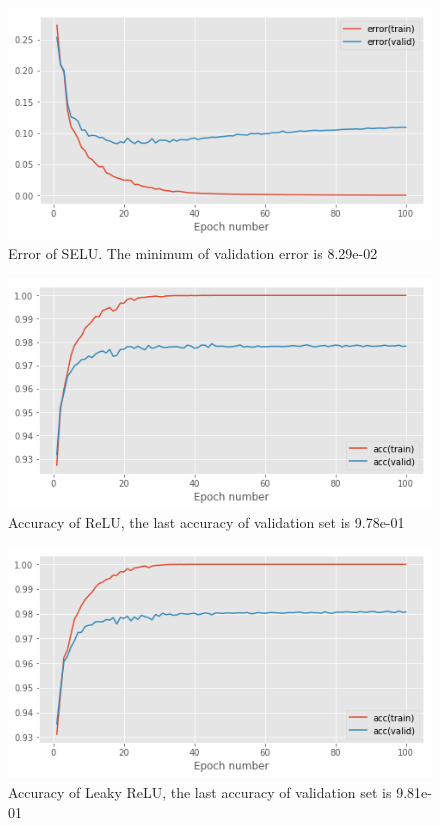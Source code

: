\documentclass{article}
\begin{document}
\begin{figure}[tb]
\vskip 5mm
\begin{center}
\centerline{\includegraphics[width=\columnwidth]{selu2e.png}}
\caption{Error of SELU. The minimum of validation error is 8.29e-02}
\label{fig:sample-graph}
\end{center}
\vskip -5mm
\end{figure}
\begin{figure}[tb]
\vskip 5mm
\begin{center}
\centerline{\includegraphics[width=\columnwidth]{relu2a.png}}
\caption{Accuracy of ReLU, the last accuracy of validation set is 9.78e-01}
\label{fig:sample-graph}
\end{center}
\vskip -5mm
\end{figure}
\begin{figure}[tb]
\vskip 5mm
\begin{center}
\centerline{\includegraphics[width=\columnwidth]{lrelu2a.png}}
\caption{Accuracy of Leaky ReLU, the last accuracy of validation set is 9.81e-01}
\label{fig:sample-graph}
\end{center}
\vskip -5mm
\end{figure}
\end{document}
